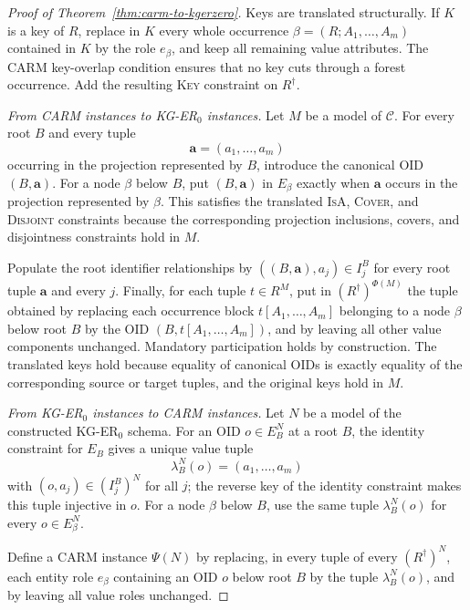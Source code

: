 \documentclass[10pt]{article}
\begin{document}
\begin{proof}[Proof of Theorem~\ref{thm:carm-to-kgerzero}]
Keys are translated structurally.  If $K$ is a key of $R$, replace in
$K$ every whole occurrence $\beta=(R;A_1,\ldots,A_m)$ contained in $K$
by the role $e_\beta$, and keep all remaining value attributes.  The
\textsf{CARM} key-overlap condition ensures that no key cuts through a
forest occurrence.  Add the resulting \textsc{Key} constraint on
$R^\dagger$.

\emph{From \textsf{CARM} instances to KG-ER$_0$ instances.}
Let $M$ be a model of $\mathcal C$.  For every root $B$ and every tuple
\[
  \mathbf a=(a_1,\ldots,a_m)
\]
occurring in the projection represented by $B$, introduce the canonical
OID $(B,\mathbf a)$.  For a node $\beta$ below $B$, put
$(B,\mathbf a)$ in $E_\beta$ exactly when $\mathbf a$ occurs in the
projection represented by $\beta$.  This satisfies the translated
\textsc{IsA}, \textsc{Cover}, and \textsc{Disjoint} constraints because
the corresponding projection inclusions, covers, and disjointness
constraints hold in $M$.

Populate the root identifier relationships by
$((B,\mathbf a),a_j)\in I^B_j$ for every root tuple $\mathbf a$ and
every $j$.  Finally, for each tuple $t\in R^M$, put in
$(R^\dagger)^{\Phi(M)}$ the tuple obtained by replacing each occurrence
block $t[A_1,\ldots,A_m]$ belonging to a node $\beta$ below root $B$ by
the OID $(B,t[A_1,\ldots,A_m])$, and by leaving all other value
components unchanged.  Mandatory participation holds by construction.
The translated keys hold because equality of canonical OIDs is exactly
equality of the corresponding source or target tuples, and the original
keys hold in $M$.

\emph{From KG-ER$_0$ instances to \textsf{CARM} instances.}
Let $N$ be a model of the constructed KG-ER$_0$ schema.  For an OID
$o\in E_B^N$ at a root $B$, the identity constraint for $E_B$ gives a
unique value tuple
\[
  \lambda_B^N(o)=(a_1,\ldots,a_m)
\]
with $(o,a_j)\in (I^B_j)^N$ for all $j$; the reverse key of the identity
constraint makes this tuple injective in $o$.  For a node $\beta$ below
$B$, use the same tuple $\lambda_B^N(o)$ for every $o\in E_\beta^N$.

Define a \textsf{CARM} instance $\Psi(N)$ by replacing, in every tuple
of every $(R^\dagger)^N$, each entity role $e_\beta$ containing an OID
$o$ below root $B$ by the tuple $\lambda_B^N(o)$, and by leaving all
value roles unchanged.


\end{proof}
\end{document}
